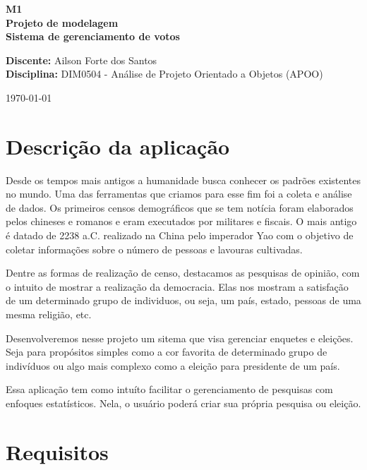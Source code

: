 \documentclass[a4paper,12pt]{article}
\begin{document}
\begin{titlepage}
\begin{center}
\centering
\linespread{2.0}
\Huge\Huge\textbf{M1} \\
\huge\huge\textbf{Projeto de modelagem} \\
\LARGE\LARGE\textbf{Sistema de gerenciamento de votos} \\
\vfill
\end{center}
\textbf{Discente: } Ailson Forte dos Santos \\
\textbf{Disciplina: } DIM0504 - Análise de Projeto Orientado a Objetos (APOO) \\
{\par\hfill\today}
\end{titlepage}
\newpage
\tableofcontents

\newpage
\section*{Descrição da aplicação}
\markright{}
Desde os tempos mais antigos a humanidade busca conhecer os padrões existentes no mundo. Uma das ferramentas que criamos para esse fim foi a coleta e análise de dados. Os primeiros censos demográficos que se tem notícia foram elaborados pelos chineses e romanos e eram executados por militares e fiscais. O mais antigo é datado de 2238 a.C. realizado na China pelo imperador Yao com o objetivo de coletar informações sobre o número de pessoas e lavouras cultivadas.
\par Dentre as formas de realização de censo, destacamos as pesquisas de opinião, com o intuito de mostrar a realização da democracia. Elas nos mostram a satisfação de um determinado grupo de individuos, ou seja, um país, estado, pessoas de uma mesma religião, etc.
\par Desenvolveremos nesse projeto um sitema que visa gerenciar enquetes e eleições. Seja para propósitos simples como a cor favorita de determinado grupo de indivíduos ou algo mais complexo como a eleição para presidente de um país.
\par Essa aplicação tem como intuíto facilitar o gerenciamento de pesquisas com enfoques estatísticos. Nela, o usuário poderá criar sua própria pesquisa ou eleição.

\newpage
\section*{Requisitos}
\markright{}
\end{document}
